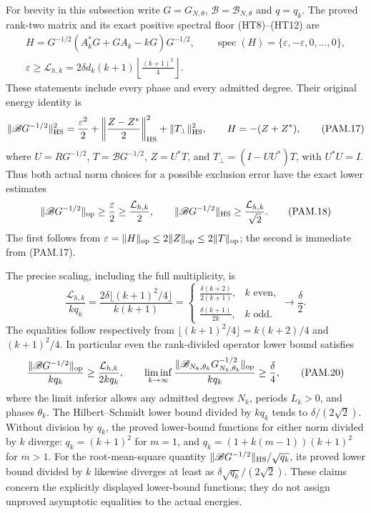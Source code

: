 For brevity in this subsection write \(G=G_{N,\theta}\),
\(\mathscr B=\mathscr B_{N,\theta}\) and \(q=q_k\).
The proved rank-two matrix and its exact positive spectral floor
(HT8)--(HT12) are
\[
 \begin{gathered}
 H=G^{-1/2}(A_k^*G+GA_k-kG)G^{-1/2},\qquad
 \operatorname{spec}(H)=\{\varepsilon,-\varepsilon,0,\ldots,0\},\\
 \varepsilon\ge
 \mathcal L_{h,k}
 =2\delta d_k(k+1)\left\lfloor\frac{(k+1)^2}{4}\right\rfloor .
 \end{gathered}
 \tag{PAM.16}\label{eq:pam-rankfloor}
\]
These statements include every phase and every admitted degree.
Their original energy identity is
\[
 \|\mathscr B G^{-1/2}\|_{\rm HS}^2
 =\frac{\varepsilon^2}{2}
  +\left\|\frac{Z-Z^*}{2}\right\|_{\rm HS}^2
  +\|T_\perp\|_{\rm HS}^2,\qquad
 H=-(Z+Z^*),
 \tag{PAM.17}\label{eq:pam-energy}
\]
where \(U=RG^{-1/2}\), \(T=\mathscr B G^{-1/2}\),
\(Z=U^*T\), and \(T_\perp=(I-UU^*)T\), with \(U^*U=I\).
Thus both actual norm choices for a possible exclusion error have
the exact lower estimates
\[
 \|\mathscr B G^{-1/2}\|_{\rm op}
       \ge\frac{\varepsilon}{2}\ge\frac{\mathcal L_{h,k}}2,
 \qquad
 \|\mathscr B G^{-1/2}\|_{\rm HS}
       \ge\frac{\mathcal L_{h,k}}{\sqrt2}.
 \tag{PAM.18}\label{eq:pam-normfloors}
\]
The first follows from
\(\varepsilon=\|H\|_{\rm op}\le2\|Z\|_{\rm op}
\le2\|T\|_{\rm op}\); the second is immediate from (PAM.17).

The precise scaling, including the full multiplicity, is
\[
 \frac{\mathcal L_{h,k}}{kq_k}
 =\frac{2\delta\lfloor(k+1)^2/4\rfloor}{k(k+1)}
 =
 \begin{cases}
  \displaystyle\frac{\delta(k+2)}{2(k+1)},&k\text{ even},\\[4pt]
  \displaystyle\frac{\delta(k+1)}{2k},&k\text{ odd}.
 \end{cases}
 \longrightarrow\frac\delta2 .
 \tag{PAM.19}\label{eq:pam-scaling}
\]
The equalities follow respectively from
\(\lfloor(k+1)^2/4\rfloor=k(k+2)/4\) and \((k+1)^2/4\).
In particular even the rank-divided operator lower bound satisfies
\[
 \frac{\|\mathscr B G^{-1/2}\|_{\rm op}}{kq_k}
 \ge\frac{\mathcal L_{h,k}}{2kq_k},\qquad
 \liminf_{k\to\infty}
 \frac{\|\mathscr B_{N_k,\theta_k}G_{N_k,\theta_k}^{-1/2}\|_{\rm op}}
      {kq_k}\ge\frac\delta4 ,
 \tag{PAM.20}\label{eq:pam-opscaling}
\]
where the limit inferior allows any admitted degrees \(N_k\), periods
\(L_k>0\), and phases \(\theta_k\).
The Hilbert--Schmidt lower bound divided by \(kq_k\)
tends to \(\delta/(2\sqrt2)\).
Without division by \(q_k\), the proved lower-bound functions
for either norm divided by \(k\) diverge: \(q_k=(k+1)^2\) for
\(m=1\), and \(q_k=(1+k(m-1))(k+1)^2\) for \(m>1\).
For the root-mean-square quantity
\(\|\mathscr B G^{-1/2}\|_{\rm HS}/\sqrt{q_k}\),
its proved lower bound divided by \(k\) likewise diverges at
least as \(\delta\sqrt{q_k}/(2\sqrt2)\).
These claims concern the explicitly displayed lower-bound
functions; they do not assign unproved asymptotic equalities
to the actual energies.

